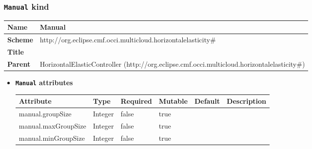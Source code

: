 \subsubsection{\texttt{Manual} kind}
\begin{center}
\begin{tabular}{|l|l|}
  \hline
  \textbf{Name} & Manual \\
  \hline  
  \textbf{Scheme} & http://org.eclipse.cmf.occi.multicloud.horizontalelasticity\# \\
  \hline
  \textbf{Title} &  \\
  \hline
  \textbf{Parent} & HorizontalElasticController (http://org.eclipse.cmf.occi.multicloud.horizontalelasticity\#) \\
  \hline
\end{tabular}
\end{center}
\begin{itemize}
\item \textbf{\texttt{Manual} attributes}

\begin{tabularx}{\textwidth}{|l|l|p{1.4cm}|p{1.3cm}|l|X|}
  \hline
  \textbf{Attribute} & \textbf{Type} & \textbf{Required} & \textbf{Mutable} & \textbf{Default} & \textbf{Description} \\
  \hline  
  manual.groupSize & Integer & false & true &  &  \\
  \hline
  manual.maxGroupSize & Integer & false & true &  &  \\
  \hline
  manual.minGroupSize & Integer & false & true &  &  \\
  \hline
\end{tabularx}
\end{itemize}



